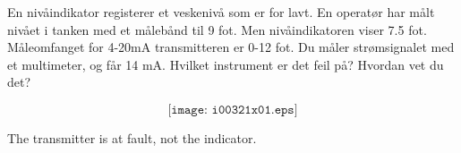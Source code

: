 


En nivåindikator registerer et veskenivå som er for lavt. En operatør har målt nivået i tanken med et målebånd til 9 fot. Men nivåindikatoren viser 7.5 fot. Måleomfanget for 4-20mA transmitteren er 0-12 fot. Du måler strømsignalet med et multimeter, og får 14 mA. Hvilket instrument er det feil på? Hvordan vet du det?

$$\texttt{[image: i00321x01.eps]}$$







The transmitter is at fault, not the indicator.











